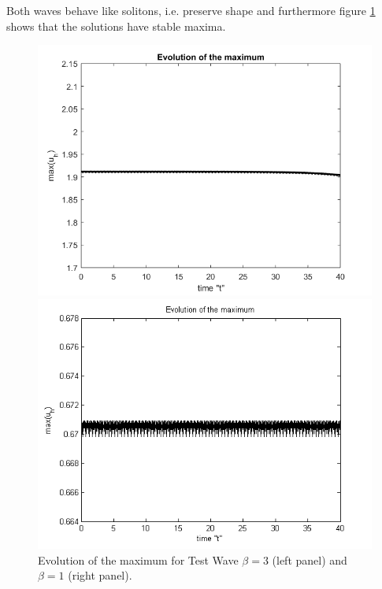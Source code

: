 \documentclass[11pt,a4paper,twoside]{article}
\begin{document}
Both waves behave like solitons, i.e. preserve shape and furthermore figure \ref{fig:solMax40} shows that the solutions have stable maxima.
\begin{figure}[ht]
	\centering
	\begin{minipage}[b]{0.4\linewidth}
		\includegraphics[width=\linewidth]{Pictures/EvolutionOfMaximum_bt3_t40.png}
	\end{minipage}	
	\begin{minipage}[b]{0.4\linewidth}
		 \includegraphics[width=\linewidth]{Pictures/EvolutionOfMaximum.png}
	\end{minipage}

	\caption{Evolution of the maximum for Test Wave $\beta =3$ (left panel) and $\beta=1$ (right panel).}
	\label{fig:solMax40}
\end{figure}
\end{document}
